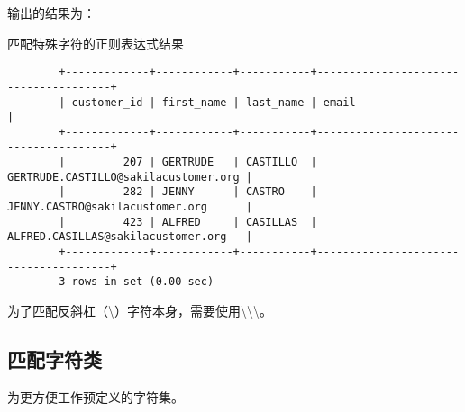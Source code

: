 \documentclass[UTF8]{article}
\begin{document}
输出的结果为：

\begin{listing}[H]
	\caption{匹配特殊字符的正则表达式结果}
	\label{code:specialmatchzhengzeresult}
\begin{verbatim}
        +-------------+------------+-----------+--------------------------------------+
        | customer_id | first_name | last_name | email                                |
        +-------------+------------+-----------+--------------------------------------+
        |         207 | GERTRUDE   | CASTILLO  | GERTRUDE.CASTILLO@sakilacustomer.org |
        |         282 | JENNY      | CASTRO    | JENNY.CASTRO@sakilacustomer.org      |
        |         423 | ALFRED     | CASILLAS  | ALFRED.CASILLAS@sakilacustomer.org   |
        +-------------+------------+-----------+--------------------------------------+
        3 rows in set (0.00 sec)
\end{verbatim}
\end{listing}

\begin{orangebox}[frametitle={Tips 9.5.1 匹配\textbackslash}]
        为了匹配反斜杠（\textbackslash）字符本身，需要使用\textbackslash \textbackslash \textbackslash。
\end{orangebox}

\subsection{匹配字符类}

\begin{redbox}[frametitle={Defination 9.6.1 字符类（character class）}]
        为更方便工作预定义的字符集。
\end{redbox}
\end{document}
